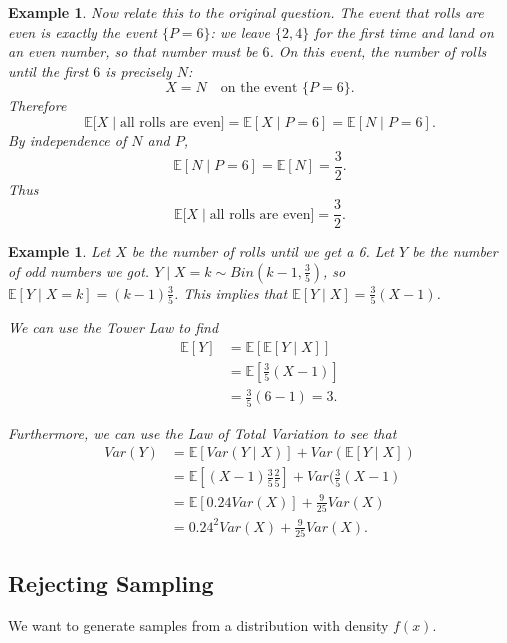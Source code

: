 \documentclass{tufte-handout}
\newcommand*\E{\mathbb{E}}
\newtheorem{ex}[thm]{Example}
\theoremstyle{definition}
\begin{document}
\begin{ex}
	\medskip
	Now relate this to the original question. The event that
	rolls are even is exactly the event $\{P=6\}$: we leave
	$\{2,4\}$ for the first time and land on an even number, so that
	number must be $6$. On this event, the number of rolls until the first
	$6$ is precisely $N$:
	\[
		X = N \quad \text{on the event } \{P=6\}.
	\]
	Therefore
	\[
		\E\bigl[X \mid \text{all rolls are even}\bigr]
		= \E[X \mid P=6]
		= \E[N \mid P=6].
	\]
	By independence of $N$ and $P$,
	\[
		\E[N \mid P=6] = \E[N] = \frac{3}{2}.
	\]
	Thus
	\[
		\E\bigl[X \mid \text{all rolls are even}\bigr] = \frac{3}{2}.
	\]
\end{ex}

\begin{ex}
	Let $X$ be the number of rolls until we get a 6. Let $Y$ be the number of odd numbers we got. $Y \mid X = k \sim Bin(k-1, \frac{3}{5})$, so $\E\left[Y \mid X = k\right] = (k-1)\frac{3}{5}$. This implies that $\E\left[Y \mid X\right] = \frac{3}{5}(X-1)$.

	We can use the Tower Law to find
	\begin{align*}
		\E\left[Y\right]  &= \E\left[\E\left[Y \mid X\right] \right] \\
		&= \E\left[\frac{3}{5}\left( X-1 \right)\right]  \\
		&= \frac{3}{5} (6-1) = 3
	.\end{align*}

	Furthermore, we can use the Law of Total Variation to see that 
	\begin{align*}
		Var(Y) &= \E\left[Var(Y \mid X)\right]  + Var(\E\left[Y \mid X \right]) \\
		&= \E\left[ (X-1) \frac{3}{5} \frac{2}{5} \right]  +Var(\frac{3}{5}(X-1) \\
		&= \E\left[0.24 Var(X)\right]   +\frac{9}{25} Var(X) \\
		&= 0.24^2 Var(X) + \frac{9}{25}Var(X)
	.\end{align*}
\end{ex}

\subsection{Rejecting Sampling}
We want to generate samples from a distribution with density $f(x)$.
\end{document}
